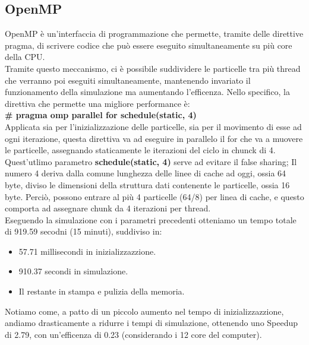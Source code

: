 \documentclass{article}
\begin{document}
\subsection{OpenMP}
OpenMP è un'interfaccia di programmazione che permette, tramite delle direttive pragma, di scrivere codice che può essere eseguito simultaneamente su più core della CPU.\\
Tramite questo meccanismo, ci è possibile suddividere le particelle tra più thread che verranno poi eseguiti simultaneamente, mantenendo invariato il funzionamento della simulazione ma aumentando l'efficenza.
Nello specifico, la direttiva che permette una migliore performance è:\\
\textbf{\#   pragma omp parallel for schedule(static, 4)}\\
Applicata sia per l'inizializzazione delle particelle, sia per il movimento di esse ad ogni iterazione, questa direttiva va ad eseguire in parallelo il for che va a muovere le particelle, assegnando staticamente le iterazioni del ciclo in chunck di 4.
Quest'utlimo parametro \textbf{schedule(static, 4)} serve ad evitare il false sharing; Il numero 4 deriva dalla comune lunghezza delle linee di cache ad oggi, ossia 64 byte, diviso le dimensioni della struttura dati contenente le particelle, ossia 16 byte. Perciò, possono entrare al più 4 particelle (64/8) per linea di cache, e questo comporta ad assegnare chunk da 4 iterazioni per thread.\\
Eseguendo la simulazione con i parametri precedenti otteniamo un tempo totale di 919.59 secodni (15 minuti), suddiviso in:
\begin{itemize}
    \item 57.71 millisecondi in inizializzazzione.
    \item 910.37 secondi in simulazione.
    \item Il restante in stampa e pulizia della memoria.
\end{itemize}
Notiamo come, a patto di un piccolo aumento nel tempo di inizializzazzione, andiamo drasticamente a ridurre i tempi di simulazione, ottenendo uno Speedup di 2.79, con un'efficenza di 0.23 (considerando i 12 core del computer).
\end{document}
